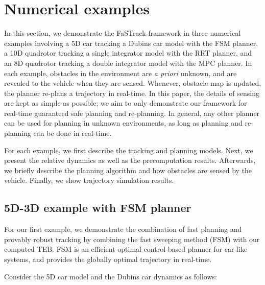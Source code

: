 \section{Numerical examples} \label{sec:results}

In this section, we demonstrate the FaSTrack framework in three numerical examples involving a 5D car tracking a Dubins car model with the FSM planner, a 10D quadrotor tracking a single integrator model with the RRT planner, and an 8D quadrotor tracking a double integrator model with the MPC planner.
In each example, obstacles in the environment are \textit{a priori} unknown, and are revealed to the vehicle when they are sensed.
Whenever, obstacle map is updated, the planner re-plans a trajectory in real-time.
In this paper, the details of sensing are kept as simple as possible; we aim to only demonstrate our framework for real-time guaranteed safe planning and re-planning.
In general, any other planner can be used for planning in unknown environments, as long as planning and re-planning can be done in real-time.

For each example, we first describe the tracking and planning models. 
Next, we present the relative dynamics as well as the precomputation results. 
Afterwards, we briefly describe the planning algorithm and how obstacles are sensed by the vehicle. 
Finally, we show trajectory simulation results.

\subsection{5D-3D example with FSM planner \label{sec:reach_planner}}

For our first example, we demonstrate the combination of fast planning and provably robust tracking by combining the fast sweeping method (FSM) \cite{} with our computed TEB. 
FSM is an efficient optimal control-based planner for car-like systems, and provides the globally optimal trajectory in real-time.

Consider the 5D car model and the Dubins car dynamics as follows:

